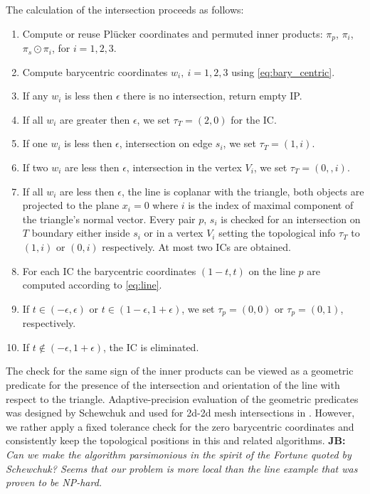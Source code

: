 \documentclass{elsarticle}
\newcommand{\noteJB}[1]{{\color{Blue} \textbf{JB: } \textit{#1}}}
\newcommand{\plucker}{Pl\"{u}cker }
\begin{document}
The calculation of the intersection proceeds as follows:
\begin{enumerate}
    \item Compute or reuse \plucker coordinates and permuted inner products: $\pi_p$, $\pi_i$, $\pi_s \odot \pi_i$, for $i=1,2,3$.
    \item Compute barycentric coordinates $w_i,\ i=1,2,3$ using \eqref{eq:bary_centric}.
    \item If any $w_i$ is less then $\epsilon$ there is no intersection, return empty IP.  
    \item If all $w_i$ are greater then $\epsilon$, we set $\tau_T = (2, 0)$ for the IC.
    \item If one $w_i$ is less then $\epsilon$, intersection on edge $s_i$, we set $\tau_T =(1,i)$.
    \item If two $w_i$ are less then $\epsilon$, intersection in the vertex $V_i$, we set $\tau_T=(0,,i)$.
    \item \label{item:coplanar} If all $w_i$ are less then $\epsilon$, the line is coplanar with the triangle, both objects are 
        projected to the plane $x_i=0$ where $i$ is the index of maximal component of the triangle's normal vector.
        Every pair $p$, $s_i$ is checked for an intersection on $T$ boundary either inside $s_i$ or in a vertex $V_i$ setting the topological info $\tau_T$ to 
        $(1, i)$ or $(0, i)$ respectively. At most two ICs are obtained.
    \item For each IC the barycentric coordinates $(1-t, t)$ on the line $p$ are computed according to \eqref{eq:line}. 
    \item If $t\in (-\epsilon, \epsilon)$ or $t\in (1-\epsilon, 1+\epsilon)$, we set $\tau_p = (0,0)$ or $\tau_p = (0,1)$, respectively.
    \item If $t\notin (-\epsilon, 1+\epsilon)$, the IC is eliminated.
\end{enumerate}

The check for the same sign of the inner products can be viewed as a geometric predicate for the presence of the intersection and orientation of the 
line with respect to the triangle. Adaptive-precision evaluation of the geometric predicates was designed by Schewchuk \cite{shewchuk_adaptive_1997}
and used for 2d-2d mesh intersections in \cite{elsheikh_reliable_2012}. However, we rather apply a fixed tolerance check for the zero 
barycentric coordinates and consistently keep the topological positions in this and related algorithms. \noteJB{Can we make the algorithm 
\emph{parsimonious} in the spirit of the Fortune \cite{fortune_stable_1989} quoted by Schewchuk? 
Seems that our problem is more local than the line example that was proven to be NP-hard.}
\end{document}
